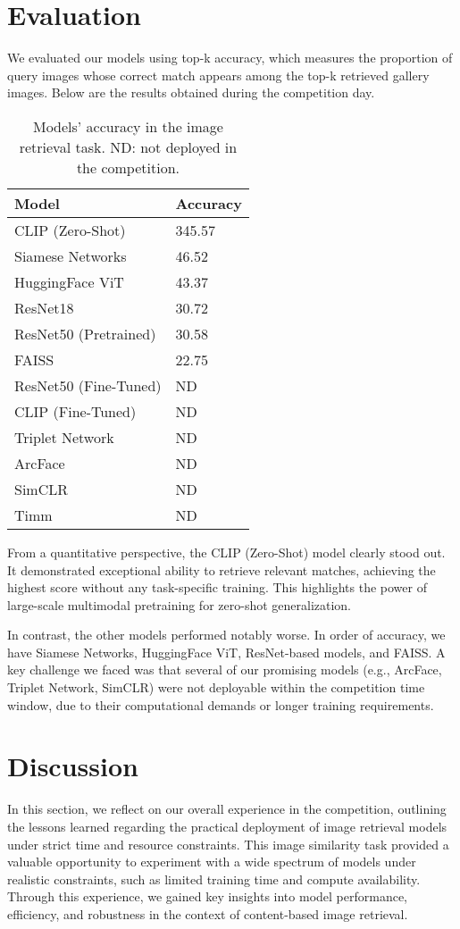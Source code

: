 \documentclass[10pt,twocolumn,letterpaper]{article}
\begin{document}
\section{Evaluation}
We evaluated our models using top-k accuracy, which measures the proportion of query images whose correct match appears among the top-k retrieved gallery images. Below are the results obtained during the competition day.

\begin{table}[ht]
\centering
\caption{Models' accuracy in the image retrieval task. ND: not deployed in the competition.}
\begin{tabular}{ll}
\toprule
\textbf{Model} & \textbf{Accuracy} \\
\midrule
CLIP (Zero-Shot) & 345.57 \\
Siamese Networks & 46.52 \\
HuggingFace ViT & 43.37 \\
ResNet18 & 30.72 \\
ResNet50 (Pretrained) & 30.58 \\
FAISS & 22.75 \\
ResNet50 (Fine-Tuned) & ND \\
CLIP (Fine-Tuned) & ND \\
Triplet Network & ND \\
ArcFace & ND \\
SimCLR & ND \\
Timm & ND \\
\bottomrule
\end{tabular}
\end{table}

From a quantitative perspective, the CLIP (Zero-Shot) model clearly stood out. It demonstrated exceptional ability to retrieve relevant matches, achieving the highest score without any task-specific training. This highlights the power of large-scale multimodal pretraining for zero-shot generalization.

In contrast, the other models performed notably worse. In order of accuracy, we have Siamese Networks, HuggingFace ViT, ResNet-based models, and FAISS. A key challenge we faced was that several of our promising models (e.g., ArcFace, Triplet Network, SimCLR) were not deployable within the competition time window, due to their computational demands or longer training requirements.

\section{Discussion}
In this section, we reflect on our overall experience in the competition, outlining the lessons learned regarding the practical deployment of image retrieval models under strict time and resource constraints.
This image similarity task provided a valuable opportunity to experiment with a wide spectrum of models under realistic constraints, such as limited training time and compute availability. Through this experience, we gained key insights into model performance, efficiency, and robustness in the context of content-based image retrieval.
\end{document}
